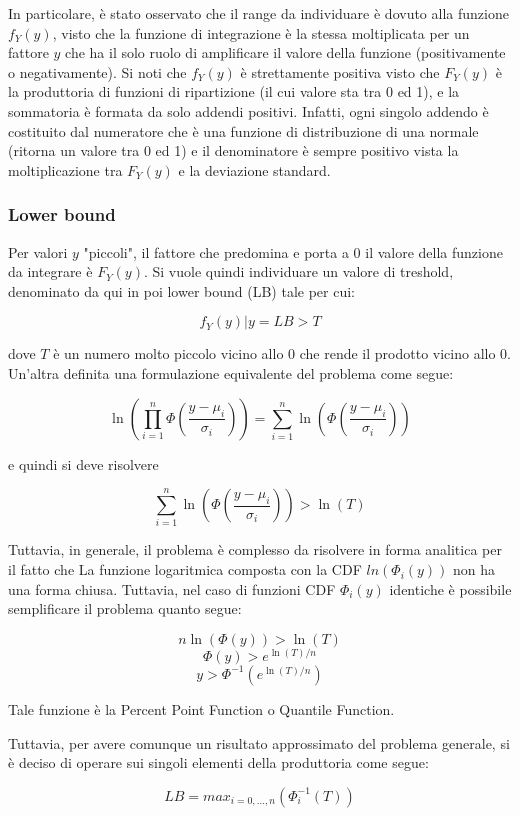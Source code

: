 In particolare, è stato osservato che il range da individuare è dovuto alla funzione $f_Y(y)$, visto che la funzione di integrazione è la stessa moltiplicata per un fattore $y$ che ha il solo ruolo di amplificare il valore della funzione (positivamente o negativamente). Si noti che $f_Y(y)$ è strettamente positiva visto che $F_Y(y)$ è la produttoria di funzioni di ripartizione (il cui valore sta tra 0 ed 1), e la sommatoria è formata da solo addendi positivi. Infatti, ogni singolo addendo è costituito dal numeratore che è una funzione di distribuzione di una normale (ritorna un valore tra 0 ed 1) e il denominatore è sempre positivo vista la moltiplicazione tra $F_Y(y)$ e la deviazione standard.


\subsubsection{Lower bound}
Per valori $y$ "piccoli", il fattore che predomina e porta a 0 il valore della funzione da integrare è $F_Y(y)$. Si vuole quindi individuare un valore di treshold, denominato da qui in poi lower bound (LB) tale per cui:

$$f_Y(y)|y = LB > T $$

dove $T$ è un numero molto piccolo vicino allo 0 che rende il prodotto vicino allo 0. Un'altra definita una formulazione equivalente del problema come segue:

	
$$\ln(\prod_{i = 1}^n \Phi(\frac{y - \mu_i}{\sigma_i})) = \sum_{i=1}^n  \ln(\Phi(\frac{y - \mu_i}{\sigma_i}))  $$

e quindi si deve risolvere

$$ \sum_{i=1}^n  \ln(\Phi(\frac{y - \mu_i}{\sigma_i})) > \ln(T) $$

Tuttavia, in generale, il problema è complesso da risolvere in forma analitica per il fatto che La funzione logaritmica composta con la CDF $ln(\Phi_i(y))$ non ha una forma chiusa. Tuttavia, nel caso di funzioni CDF $\Phi_i(y)$ identiche è possibile semplificare il problema quanto segue:

$$
n \ln(\Phi(y)) > \ln(T)
$$
$$
\Phi(y) > e^{\ln(T) / n}
$$
$$
y > \Phi^{-1}(e^{\ln(T) / n})
$$

Tale funzione è la Percent Point Function o Quantile Function.

Tuttavia, per avere comunque un risultato approssimato del problema generale, si è deciso di operare sui singoli elementi della produttoria come segue:

$$LB = max_{i=0,...,n}( \Phi_i^{-1}(T))$$

